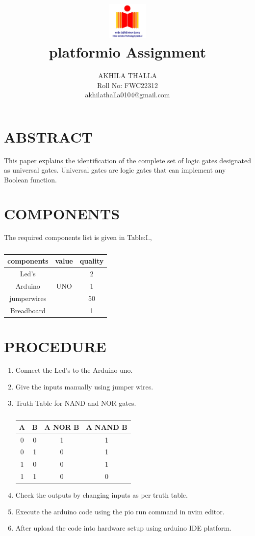 \documentclass[conference]{IEEEtran}
\title{
\vspace{1cm}
{\includegraphics[width=0.15\textwidth]{1.jpg} \\ platformio Assignment} }
\author{AKHILA THALLA\\ Roll No: FWC22312 \\ akhilathalla0104@gmail.com}
\begin{document}
\maketitle
 \section {ABSTRACT}
 This paper explains the identification of the complete set of logic gates designated as universal gates. Universal gates are logic gates that can implement any Boolean function.
 \section{COMPONENTS}
 The required components list is given in Table:I.,
 \vspace{0.3cm}
 \begin{table} [htbp]
 \centering
 \begin{tabular}{| c | c | c |} \hline
 components & value & quality \\ \hline
 Led's & & 2 \\ \hline
 Arduino & UNO & 1 \\ \hline
 jumperwires & & 50 \\ \hline
 Breadboard & & 1 \\
 \hline
 \end{tabular}
 \vspace{0.3cm}
 \caption{\label{tab:widgets}}
 \end{table}
 \section{PROCEDURE}
 \begin{enumerate}
	 \item Connect the Led's to the Arduino uno.
	 \item Give the inputs manually using jumper wires.
	 \item Truth Table for NAND and NOR gates.
		 \begin{table}[htbp]
			 \centering
			 \begin{tabular}{|c|c|c|c|}
				 \hline
				 A & B & A NOR B & A NAND B \\
				 \hline
				 0 & 0 & 1 & 1 \\
				 \hline
				 0 & 1 & 0 & 1 \\
				 \hline
				 1 & 0 & 0 & 1 \\
				 \hline
				 1 & 1 & 0 & 0 \\
				 \hline
			 \end{tabular}
			 \vspace{0.1cm}
			 \caption{\label{tab:widgets}}
		 \end{table}
	 \item Check the outputs by changing inputs as per truth table.
	 \item Execute the arduino code using the pio run command in nvim editor.
	 \item After upload the code into hardware setup using arduino IDE platform.
 \end{enumerate}
\end{document}
